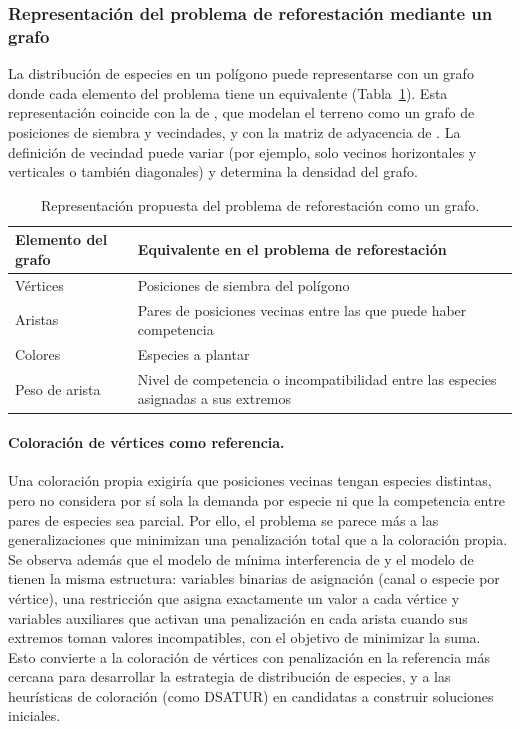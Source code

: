 \documentclass[11pt]{article}
\begin{document}
\subsubsection{Representación del problema de reforestación mediante un grafo}

La distribución de especies en un polígono puede representarse con un grafo donde cada elemento del problema tiene un equivalente (Tabla~\ref{tab:grafo-reforestacion}). Esta representación coincide con la de \textcite{elizalde2025}, que modelan el terreno como un grafo de posiciones de siembra y vecindades, y con la matriz de adyacencia de \textcite{liu2026}. La definición de vecindad puede variar (por ejemplo, solo vecinos horizontales y verticales o también diagonales) y determina la densidad del grafo.

\begin{table}[ht]
  \centering
  \caption{Representación propuesta del problema de reforestación como un grafo.}
  \label{tab:grafo-reforestacion}
  \small
  \begin{tabularx}{\textwidth}{@{}p{3.2cm}X@{}}
    \toprule
    Elemento del grafo & Equivalente en el problema de reforestación \\
    \midrule
    Vértices & Posiciones de siembra del polígono \\
    Aristas & Pares de posiciones vecinas entre las que puede haber competencia \\
    Colores & Especies a plantar \\
    Peso de arista & Nivel de competencia o incompatibilidad entre las especies asignadas a sus extremos \\
    \bottomrule
  \end{tabularx}
\end{table}

\paragraph{Coloración de vértices como referencia.} Una coloración propia exigiría que posiciones vecinas tengan especies distintas, pero no considera por sí sola la demanda por especie ni que la competencia entre pares de especies sea parcial. Por ello, el problema se parece más a las generalizaciones que minimizan una penalización total que a la coloración propia. Se observa además que el modelo de mínima interferencia de \textcite{eisenblatter2002} y el modelo de \textcite{elizalde2025} tienen la misma estructura: variables binarias de asignación (canal o especie por vértice), una restricción que asigna exactamente un valor a cada vértice y variables auxiliares que activan una penalización en cada arista cuando sus extremos toman valores incompatibles, con el objetivo de minimizar la suma. Esto convierte a la coloración de vértices con penalización en la referencia más cercana para desarrollar la estrategia de distribución de especies, y a las heurísticas de coloración (como DSATUR) en candidatas a construir soluciones iniciales.
\end{document}
